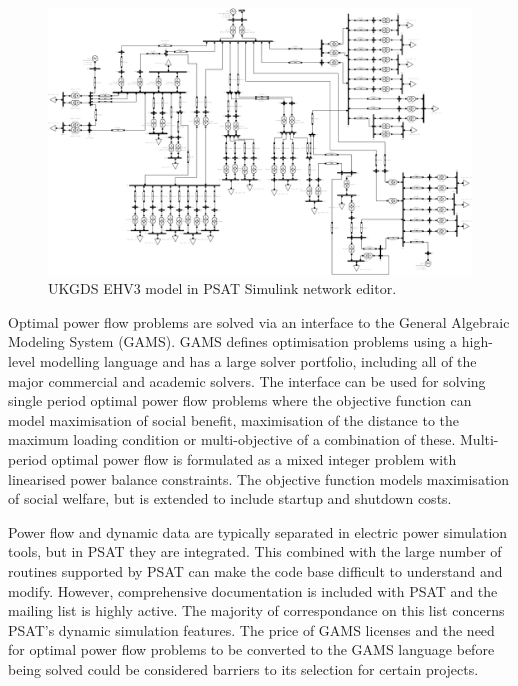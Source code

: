 \begin{figure}
  \centering
  \includegraphics[width=20cm,angle=90]{figures/psat}
  \caption{UKGDS EHV3 model in PSAT Simulink network editor.}
  \label{fig:ukgds_ehv3}
\end{figure}

Optimal power flow problems are solved via an interface to the General
Algebraic Modeling System (GAMS).  GAMS defines optimisation
problems using a high-level modelling language and has a large solver portfolio, including all
of the major commercial and academic solvers.  The interface can be used for
solving single period optimal power flow problems where the objective function
can model maximisation of social benefit, maximisation of the distance to
the maximum loading condition or multi-objective of a combination of these.
Multi-period optimal power flow is formulated as a mixed integer problem with
linearised power balance constraints.  The objective function models
maximisation of social welfare, but is extended to include startup and
shutdown costs.

Power flow and dynamic data are typically separated in electric power
simulation tools, but in PSAT they are integrated.  This combined with the
large number of routines supported by PSAT can make the code base difficult to
understand and modify.  However, comprehensive documentation is included with
PSAT and the mailing list is highly active.  The majority of correspondance on
this list concerns PSAT's dynamic simulation features.  The price of GAMS
licenses and the need for optimal power flow problems to be converted to the
GAMS language before being solved could be considered barriers to its
selection for certain projects.


